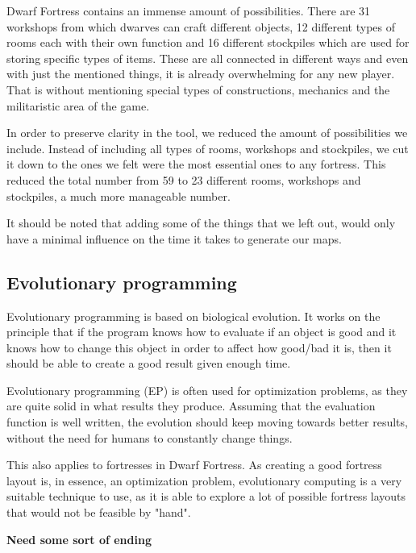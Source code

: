Dwarf Fortress contains an immense amount of possibilities. There are 31 workshops from which dwarves can craft different objects, 12 different types of rooms each with their own function and 16 different stockpiles which are used for storing specific types of items. These are all connected in different ways and even with just the mentioned things, it is already overwhelming for any new player. That is without mentioning special types of constructions, mechanics and the militaristic area of the game.

In order to preserve clarity in the tool, we reduced the amount of possibilities we include. Instead of including all types of rooms, workshops and stockpiles, we cut it down to the ones we felt were the most essential ones to any fortress. This reduced the total number from 59 to 23 different rooms, workshops and stockpiles, a much more manageable number.

It should be noted that adding some of the things that we left out, would only have a minimal influence on the time it takes to generate our maps.


\subsection{Evolutionary programming}
\label{02_Evolution}

Evolutionary programming\cite[Chapter 2]{IoEC} is based on biological evolution. It works on the principle that if the program knows how to evaluate if an object is good and it knows how to change this object in order to affect how good/bad it is, then it should be able to create a good result given enough time.

Evolutionary programming (EP) is often used for optimization problems, as they are quite solid in what results they produce. Assuming that the evaluation function is well written, the evolution should keep moving towards better results, without the need for humans to constantly change things.

This also applies to fortresses in Dwarf Fortress. As creating a good fortress layout is, in essence, an optimization problem, evolutionary computing is a very suitable technique to use, as it is able to explore a lot of possible fortress layouts that would not be feasible by "hand".

\textbf{Need some sort of ending}



